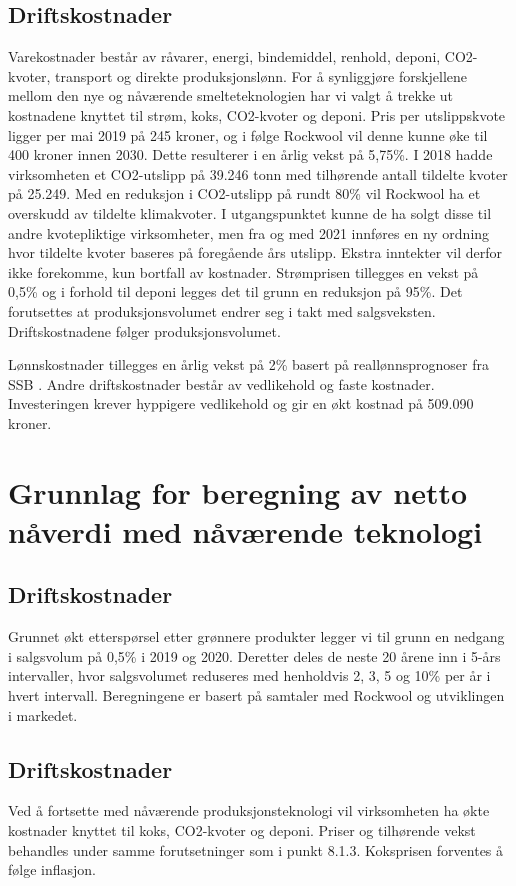 \subsection{Driftskostnader}
Varekostnader består av råvarer, energi, bindemiddel, renhold, deponi, CO2-kvoter, transport og direkte produksjonslønn. For å synliggjøre forskjellene mellom den nye og nåværende smelteteknologien har vi valgt å trekke ut kostnadene knyttet til strøm, koks, CO2-kvoter og deponi. Pris per utslippskvote ligger per mai 2019 på 245 kroner, og i følge Rockwool vil denne kunne øke til 400 kroner innen 2030. Dette resulterer i en årlig vekst på 5,75\%. I 2018 hadde virksomheten et CO2-utslipp på 39.246 tonn med tilhørende antall tildelte kvoter på 25.249. Med en reduksjon i CO2-utslipp på rundt 80\% vil Rockwool ha et overskudd av tildelte klimakvoter. I utgangspunktet kunne de ha solgt disse til andre kvotepliktige virksomheter, men fra og med 2021 innføres en ny ordning hvor tildelte kvoter baseres på foregående års utslipp. Ekstra inntekter vil derfor ikke forekomme, kun bortfall av kostnader. Strømprisen tillegges en vekst på 0,5\% og i forhold til deponi legges det til grunn en reduksjon på 95\%. Det forutsettes at produksjonsvolumet endrer seg i takt med salgsveksten. Driftskostnadene følger produksjonsvolumet.

\indent \newline
Lønnskostnader tillegges en årlig vekst på 2\% basert på reallønnsprognoser fra SSB \cite{reallonnsprognoser}.
Andre driftskostnader består av vedlikehold og faste kostnader. Investeringen krever hyppigere vedlikehold og gir en økt kostnad på 509.090 kroner.

\section{Grunnlag for beregning av netto nåverdi med nåværende teknologi}
\subsection{Driftskostnader}
Grunnet økt etterspørsel etter grønnere produkter legger vi til grunn en nedgang i salgsvolum på 0,5\% i 2019 og 2020. Deretter deles de neste 20 årene inn i 5-års intervaller, hvor salgsvolumet reduseres med henholdvis 2, 3, 5 og 10\% per år i hvert intervall. Beregningene er basert på samtaler med Rockwool og utviklingen i markedet. 

\subsection{Driftskostnader}
Ved å fortsette med nåværende produksjonsteknologi vil virksomheten ha økte kostnader knyttet til koks, CO2-kvoter og deponi. Priser og tilhørende vekst behandles under samme forutsetninger som i punkt 8.1.3. Koksprisen forventes å følge inflasjon.

